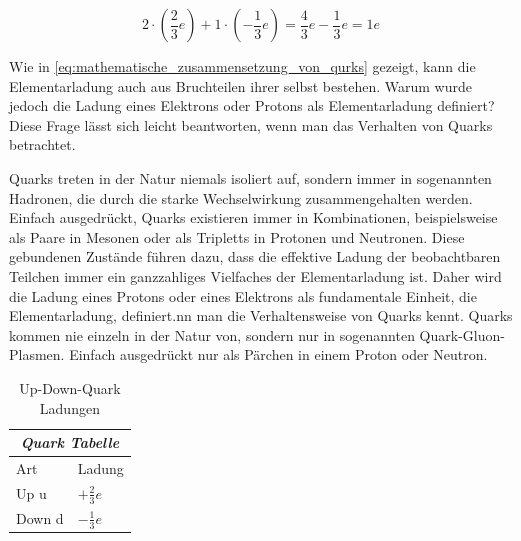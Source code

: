 \begin{equation}\label{eq:mathematische_zusammensetzung_von_qurks}
	2 \cdot \left(\frac{2}{3}e\right)  + 1 \cdot \left( -\frac{1}{3}e\right) 
	= \frac{4}{3}e - \frac{1}{3}e = 1e
\end{equation}

\noindent Wie in \autoref{eq:mathematische_zusammensetzung_von_qurks} gezeigt, kann die Elementarladung auch aus Bruchteilen ihrer selbst bestehen. Warum wurde jedoch die Ladung eines Elektrons oder Protons als Elementarladung definiert? Diese Frage lässt sich leicht beantworten, wenn man das Verhalten von Quarks betrachtet.

Quarks treten in der Natur niemals isoliert auf, sondern immer in sogenannten Hadronen, die durch die starke Wechselwirkung zusammengehalten werden. Einfach ausgedrückt, Quarks existieren immer in Kombinationen, beispielsweise als Paare in Mesonen oder als Tripletts in Protonen und Neutronen. Diese gebundenen Zustände führen dazu, dass die effektive Ladung der beobachtbaren Teilchen immer ein ganzzahliges Vielfaches der Elementarladung ist. Daher wird die Ladung eines Protons oder eines Elektrons als fundamentale Einheit, die Elementarladung, definiert.nn man die Verhaltensweise von Quarks kennt. Quarks kommen nie einzeln in der Natur von, sondern nur in sogenannten Quark-Gluon-Plasmen. Einfach ausgedrückt nur als Pärchen in einem Proton oder Neutron.


\begin{table}[ht]
	\begin{center}
		\begin{tabular}{l|l}
			\multicolumn{2}{c}{\textit{\textbf{Quark Tabelle}}} \\
			\hline
			Art & Ladung \\
			\hline
			Up u & $+ \frac{2}{3}e$ \\
			\hline
			Down d & $- \frac{1}{3}e$\\
			\hline
		\end{tabular}
	\end{center}
	\caption{Up-Down-Quark Ladungen}
	\label{tab:quark_tabelle}
\end{table}


